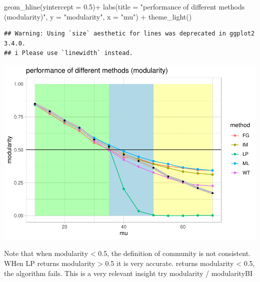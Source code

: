\documentclass[
]{article}
\newenvironment{Shaded}{\begin{snugshade}}{\end{snugshade}}
\newcommand{\AttributeTok}[1]{\textcolor[rgb]{0.77,0.63,0.00}{#1}}
\newcommand{\FloatTok}[1]{\textcolor[rgb]{0.00,0.00,0.81}{#1}}
\newcommand{\FunctionTok}[1]{\textcolor[rgb]{0.00,0.00,0.00}{#1}}
\newcommand{\NormalTok}[1]{#1}
\newcommand{\SpecialCharTok}[1]{\textcolor[rgb]{0.00,0.00,0.00}{#1}}
\newcommand{\StringTok}[1]{\textcolor[rgb]{0.31,0.60,0.02}{#1}}
\begin{document}
\begin{Shaded}
\begin{Highlighting}[]
     \FunctionTok{geom\_hline}\NormalTok{(}\AttributeTok{yintercept =} \FloatTok{0.5}\NormalTok{)}\SpecialCharTok{+}
    \FunctionTok{labs}\NormalTok{(}\AttributeTok{title =} \StringTok{"performance of different methods (modularity)"}\NormalTok{, }\AttributeTok{y =} \StringTok{"modularity"}\NormalTok{, }\AttributeTok{x =} \StringTok{"mu"}\NormalTok{) }\SpecialCharTok{+}
    \FunctionTok{theme\_light}\NormalTok{()   }
\end{Highlighting}
\end{Shaded}

\begin{verbatim}
## Warning: Using `size` aesthetic for lines was deprecated in ggplot2 3.4.0.
## i Please use `linewidth` instead.
\end{verbatim}

\includegraphics{com_det_algorithms_files/figure-latex/unnamed-chunk-10-1.pdf}

Note that when modularity \textless{} 0.5, the definition of community
is not consistent. WHen LP returns modularity \textgreater{} 0.5 it is
very accurate. returns modularity \textless{} 0.5, the algorithm fails.
This is a very relevant insight try modularity / modularityBI
\end{document}

